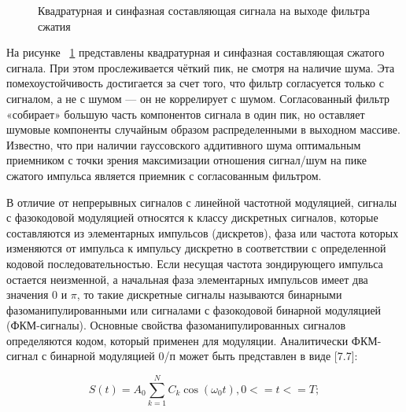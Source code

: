 \begin{figure}[h]
    \centering
    \noindent
    \caption{Квадратурная и синфазная составляющая сигнала на выходе фильтра сжатия}
    \label{fig:correl}
\end{figure}

На рисунке ~\ref{fig:correl} представлены квадратурная и синфазная составляющая сжатого сигнала. При этом прослеживается чёткий пик, не смотря на наличие шума. Эта помехоустойчивость достигается за счет того, что фильтр согласуется только с сигналом, а не с шумом — он не коррелирует с шумом. Согласованный фильтр «собирает» большую часть компонентов сигнала в один пик, но оставляет шумовые компоненты случайным образом распределенными в выходном массиве. Известно, что при наличии гауссовского аддитивного шума оптимальным приемником с точки зрения максимизации отношения сигнал/шум на пике сжатого импульса является приемник с согласованным фильтром.

В отличие от непрерывных сигналов с линейной частотной модуляцией, сигналы с фазокодовой модуляцией относятся к классу дискретных сигналов, которые составляются из элементарных импульсов (дискретов), фаза или частота которых изменяются от импульса к импульсу дискретно в соответствии с определенной кодовой последовательностью. Если несущая частота зондирующего импульса остается неизменной, а начальная фаза элементарных импульсов имеет два значения 0 и $\pi$, то такие дискретные сигналы называются бинарными фазоманипулированными или сигналами с фазокодовой бинарной модуляцией (ФКМ-сигналы). Основные свойства фазоманипулированных сигналов определяются кодом, который применен для модуляции. Аналитически ФКМ-сигнал с бинарной модуляцией 0/п может быть представлен в виде [7.7]:

\begin{equation}
    S(t) = A_{0}\sum_{k=1}^{N} C_{k}\cos(\omega_{0}t),   0 <= t <= T;
\end{equation}

